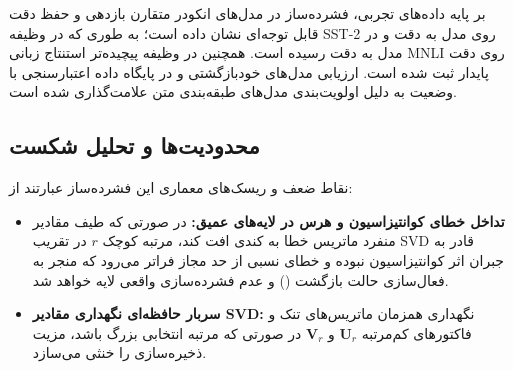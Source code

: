 بر پایه داده‌های تجربی، فشرده‌ساز  در مدل‌های انکودر متقارن بازدهی و حفظ دقت قابل توجه‌ای نشان داده است؛ به طوری که در وظیفه SST-2 روی مدل  به دقت  و در مدل  به دقت  رسیده است. همچنین در وظیفه پیچیده‌تر استنتاج زبانی MNLI روی  دقت پایدار  ثبت شده است. ارزیابی مدل‌های خودبازگشتی  و  در پایگاه داده اعتبارسنجی با وضعیت  به دلیل اولویت‌بندی مدل‌های طبقه‌بندی متن علامت‌گذاری شده است.

\subsection{محدودیت‌ها و تحلیل شکست}
نقاط ضعف و ریسک‌های معماری این فشرده‌ساز عبارتند از:
\begin{itemize}
    \item \textbf{تداخل خطای کوانتیزاسیون و هرس در لایه‌های عمیق:} در صورتی که طیف مقادیر منفرد ماتریس خطا به کندی افت کند، مرتبه کوچک $r$ در تقریب SVD قادر به جبران اثر کوانتیزاسیون نبوده و خطای نسبی از حد مجاز فراتر می‌رود که منجر به فعال‌سازی حالت بازگشت () و عدم فشرده‌سازی واقعی لایه خواهد شد.
    \item \textbf{سربار حافظه‌ای نگهداری مقادیر SVD:} نگهداری همزمان ماتریس‌های تنک و فاکتورهای کم‌مرتبه $\mathbf{U}_r$ و $\mathbf{V}_r$ در صورتی که مرتبه انتخابی بزرگ باشد، مزیت ذخیره‌سازی را خنثی می‌سازد.
\end{itemize}

